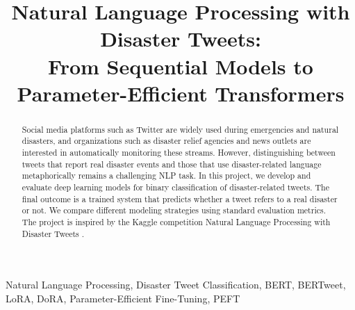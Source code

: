 \documentclass[conference]{IEEEtran}
\begin{document}

\title{Natural Language Processing with Disaster Tweets:\\
       From Sequential Models to Parameter-Efficient Transformers}

\author{
    \and
    \and
    \and
}

\maketitle


\begin{abstract}
Social media platforms such as Twitter are widely used during emergencies and natural disasters, and organizations such as disaster relief agencies and news outlets are interested in automatically monitoring these streams. However, distinguishing between tweets that report real disaster events and those that use disaster-related language metaphorically remains a challenging NLP task. In this project, we develop and evaluate deep learning models for binary classification of disaster-related tweets. The final outcome is a trained system that predicts whether a tweet refers to a real disaster or not. We compare different modeling strategies using standard evaluation metrics. The project is inspired by the Kaggle competition Natural Language Processing with Disaster Tweets \cite{kaggle}.
\end{abstract}

\begin{IEEEkeywords}
Natural Language Processing, Disaster Tweet Classification, BERT, BERTweet,
LoRA, DoRA, Parameter-Efficient Fine-Tuning, PEFT
\end{IEEEkeywords}
\end{document}
